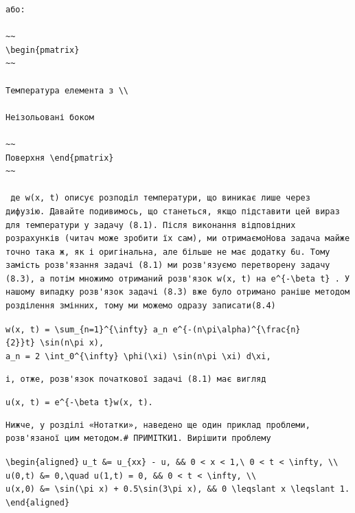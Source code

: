 \documentclass[
  ukrainian,
]{article}
\begin{document}
\begin{verbatim}
або:

~~
\begin{pmatrix}
~~

Температура елемента з \\

Неізольовані боком

~~
Поверхня \end{pmatrix}
~~

 де w(x, t) описує розподіл температури, що виникає лише через дифузію. Давайте подивимось, що станеться, якщо підставити цей вираз для температури у задачу (8.1). Після виконання відповідних розрахунків (читач може зробити їх сам), ми отримаємоНова задача майже точно така ж, як і оригінальна, але більше не має додатку 6u. Тому замість розв'язання задачі (8.1) ми розв'язуємо перетворену задачу (8.3), а потім множимо отриманий розв'язок w(x, t) на e^{-\beta t} . У нашому випадку розв'язок задачі (8.3) вже було отримано раніше методом розділення змінних, тому ми можемо одразу записати(8.4)
\end{verbatim}

\texttt{w(x,\ t)\ =\ \textbackslash{}sum\_\{n=1\}\^{}\{\textbackslash{}infty\}\ a\_n\ e\^{}\{-(n\textbackslash{}pi\textbackslash{}alpha)\^{}\{\textbackslash{}frac\{n\}\{2\}\}t\}\ \textbackslash{}sin(n\textbackslash{}pi\ x),}
\texttt{a\_n\ =\ 2\ \textbackslash{}int\_0\^{}\{\textbackslash{}infty\}\ \textbackslash{}phi(\textbackslash{}xi)\ \textbackslash{}sin(n\textbackslash{}pi\ \textbackslash{}xi)\ d\textbackslash{}xi,}

\begin{verbatim}
і, отже, розв'язок початкової задачі (8.1) має вигляд
\end{verbatim}

\texttt{u(x,\ t)\ =\ e\^{}\{-\textbackslash{}beta\ t\}w(x,\ t).}

\begin{verbatim}
Нижче, у розділі «Нотатки», наведено ще один приклад проблеми, розв'язаної цим методом.# ПРИМІТКИ1. Вирішити проблему
\end{verbatim}

\texttt{\textbackslash{}begin\{aligned\}}
\texttt{u\_t\ \&=\ u\_\{xx\}\ -\ u,\ \&\&\ 0\ \textless{}\ x\ \textless{}\ 1,\textbackslash{}\ 0\ \textless{}\ t\ \textless{}\ \textbackslash{}infty,\ \textbackslash{}\textbackslash{}}
\texttt{u(0,t)\ \&=\ 0,\textbackslash{}quad\ u(1,t)\ =\ 0,\ \&\&\ 0\ \textless{}\ t\ \textless{}\ \textbackslash{}infty,\ \textbackslash{}\textbackslash{}}
\texttt{u(x,0)\ \&=\ \textbackslash{}sin(\textbackslash{}pi\ x)\ +\ 0.5\textbackslash{}sin(3\textbackslash{}pi\ x),\ \&\&\ 0\ \textbackslash{}leqslant\ x\ \textbackslash{}leqslant\ 1.}
\texttt{\textbackslash{}end\{aligned\}}
\end{document}

